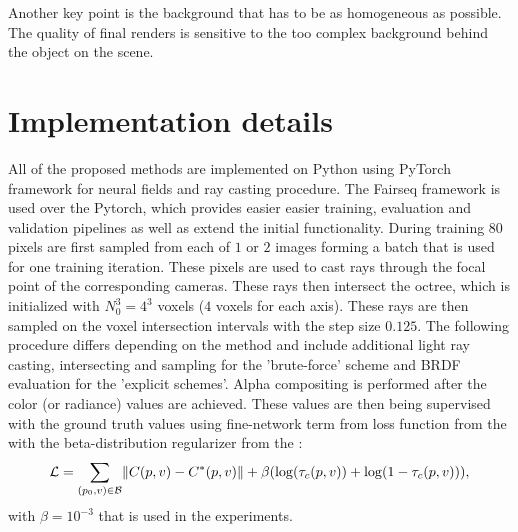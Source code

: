 Another key point is the background that has to be as homogeneous as possible.
The quality of final renders is sensitive to the too complex background behind the object on the scene.





\section{Implementation details}

All of the proposed methods are implemented on Python
using PyTorch \cite{pytorch} framework
for neural fields and ray casting procedure.
The Fairseq \cite{ott2019fairseq} framework is used over the Pytorch,
which provides easier easier training, evaluation and validation pipelines as well as extend the initial functionality.
During training $80$ pixels are first sampled from each of $1$ or $2$ images 
forming a batch that is used for one training iteration.
These pixels are used to cast rays through the focal point of the corresponding cameras.
These rays then intersect the octree, which is initialized with $N_0^3 = 4^3$ voxels ($4$ voxels for each axis).
These rays are then sampled on the voxel intersection intervals with the step size $0.125$.
The following procedure differs depending on the method
and include additional light ray casting, intersecting and sampling for the 'brute-force' scheme and BRDF evaluation for the 'explicit schemes'.
Alpha compositing is performed after the color (or radiance) values are achieved.
These values are then being supervised with the ground truth values using fine-network term from loss function from the  with the beta-distribution regularizer from the :
\begin{equation}
    \mathcal{L} = \sum_{(p_0,v)\in\mathcal{B}} \norm{ C(p, v) - C^*(p, v) } + \beta(\log(\tau_c(p, v)) + \log(1 - \tau_c(p, v))),
\end{equation}
with $\beta = 10^{-3}$ that is used in the experiments.

